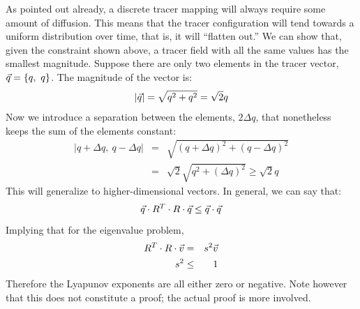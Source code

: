 \documentclass{article}
\begin{document}
As pointed out already, a discrete tracer mapping will always require some 
amount of diffusion.  This means that the tracer configuration will 
tend towards a uniform distribution over time, 
that is, it will ``flatten out.''  We can
show that, given the constraint shown above, 
a tracer field with all the same values has the smallest magnitude.  
Suppose there are only two elements in the 
tracer vector, $\vec q=\lbrace q,~q \rbrace$.  The magnitude of the vector is:
\begin{equation}
|\vec q|=\sqrt{q^2+q^2}=\sqrt{2} q
\end{equation}
Now we introduce a separation between the elements, $2\Delta q$, that 
nonetheless keeps the sum of the elements constant:
\begin{eqnarray}
|q+\Delta q,~q-\Delta q| & = & \sqrt{(q+\Delta q)^2+(q-\Delta q)^2} \\
& = & \sqrt{2}\sqrt{q^2+(\Delta q)^2} \ge \sqrt{2} q
\end{eqnarray}
This will generalize to higher-dimensional vectors.  In general, we can
say that:
\begin{equation}
\vec q \cdot R^T \cdot R \cdot \vec q \le \vec q \cdot \vec q
\label{tracer_map_inequality}
\end{equation}
Implying that for the eigenvalue problem,
\begin{eqnarray}
R^T \cdot R \cdot \vec v & = & s^2 \vec v \nonumber\\
s^2 & \le & 1 \label{SV_inequality}
\end{eqnarray}
Therefore the Lyapunov exponents are all
either zero or negative.
Note however that this does not constitute a proof; the actual proof is more 
involved.
\end{document}
